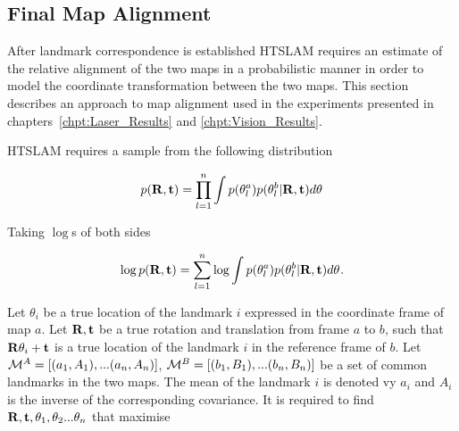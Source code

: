 
\subsection{Final Map Alignment}
\label{sec:map_alignment}

After landmark correspondence is established HTSLAM requires an
estimate of the relative alignment of the two maps in a
probabilistic manner in order to model the coordinate transformation
between the two maps. This section describes an approach to map
alignment used in the experiments presented in
chapters~\ref{chpt:Laser_Results} and \ref{chpt:Vision_Results}.

HTSLAM requires a sample from the following distribution

\begin{equation}
p({\bf R},{\bf t}) = \prod_{l=1}^{n} \int
p(\mape{}{a}{l})p(\mape{}{b}{l}|{\bf R},{\bf t})d\mape{}{}{}
\label{eqn:align_w}
\end{equation}

Taking $\log$s of both sides

\begin{equation}
\log p({\bf R},{\bf t}) = \sum_{l=1}^{n} \log \int
p(\mape{}{a}{l})p(\mape{}{b}{l}|{\bf R},{\bf t})d\mape{}{}{}.
\label{eqn:align_log_w}
\end{equation}

Let $\theta_i$ be a true location of the landmark $i$ expressed in the
coordinate frame of map $a$. Let ${\bf R,t}$ be a true rotation and
translation from frame $a$ to $b$, such that ${\bf R}\theta_i + {\bf t}$
is a true location of the landmark $i$ in the reference frame of
$b$. Let $\mapA=[(a_1,A_1),...(a_n,A_n)]$,
$\mapB=[(b_1,B_1),...(b_n,B_n)]$ be a set of common landmarks in the two
maps. The mean of the landmark $i$ is denoted vy $a_i$ and $A_i$ is the
inverse of the corresponding covariance. It is required to find ${\bf
R,t},\theta_1, \theta_2 ...\theta_n$ that maximise

